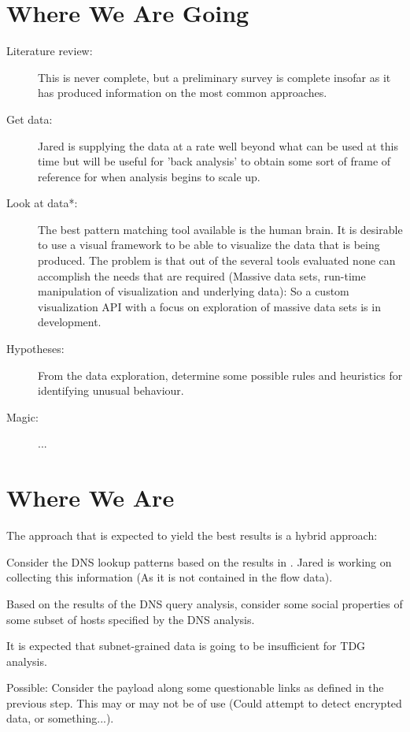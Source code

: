 \documentclass{article}
\theoremstyle{remark}
\theoremstyle{definition}
\theoremstyle{definition}
\theoremstyle{definition}
\begin{document}
\section{Where We Are Going}
\begin{description}
\item[Literature review: ] This is never complete, but a preliminary survey is complete insofar as it has produced information on the most common approaches.
\item[Get data: ] Jared is supplying the data at a rate well beyond what can be used at this time but will be useful for 'back analysis' to obtain some sort of frame of reference for when analysis begins to scale up.
\item[Look at data*: ] The best pattern matching tool available is the human brain. It is desirable to use a visual framework to be able to visualize the data that is being produced. The problem is that out of the several tools evaluated none can accomplish the needs that are required (Massive data sets, run-time manipulation of visualization and underlying data): So a custom visualization API with a focus on exploration of massive data sets is in development.
\item[Hypotheses: ] From the data exploration, determine some possible rules and heuristics for identifying unusual behaviour.
\item[Magic: ] ...
\end{description}

\section{Where We Are}
The approach that is expected to yield the best results is a hybrid approach:

\begin{description}
\item Consider the DNS lookup patterns based on the results in \cite{DNS}. Jared is working on collecting this information (As it is not contained in the flow data).
\item Based on the results of the DNS query analysis, consider some social properties of some subset of hosts specified by the DNS analysis.

It is expected that subnet-grained data is going to be insufficient for TDG analysis.
\item Possible: Consider the payload along some questionable links as defined in the previous step. This may or may not be of use (Could attempt to detect encrypted data, or something...).
\end{description}

\nocite{*}

\end{document}
